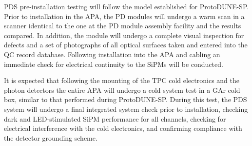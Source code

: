 PDS pre-installation testing will follow the model established for ProtoDUNE-SP.  Prior to installation in the APA, the PD modules will undergo a warm scan in a scanner identical to the one at the PD module assembly facility and the results compared.  In addition, the module will undergo a complete visual inspection for defects and a set of photographs of all optical surfaces taken and entered into the QC record database.  Following installation into the APA and cabling an immediate check for electrical continuity to the SiPMs will be conducted.

It is expected that following the mounting of the TPC cold electronics and the photon detectors the entire APA will undergo a cold system test in a GAr cold box, similar to that performed during ProtoDUNE-SP.  During this test, the PDS system will undergo a final integrated system check prior to installation, checking dark and LED-stimulated SiPM performance for all channels, checking for electrical interference with the cold electronics, and confirming compliance with the detector grounding scheme.
